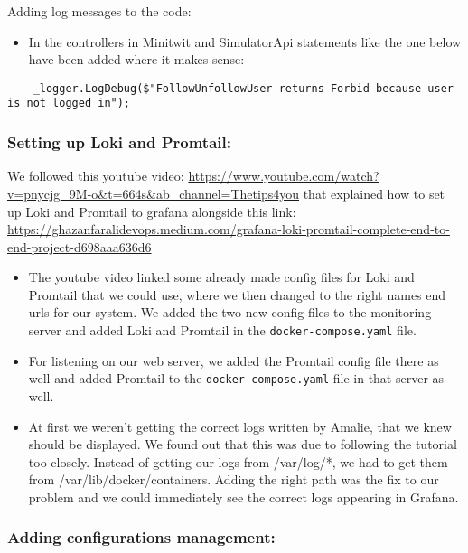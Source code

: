 Adding log messages to the code:

\begin{itemize}
    \item In the controllers in Minitwit and SimulatorApi statements like the one below have been added where it makes sense:
\end{itemize}


\begin{verbatim}
    _logger.LogDebug($"FollowUnfollowUser returns Forbid because user is not logged in");
\end{verbatim}

\subsubsection{Setting up Loki and Promtail:}
\label{log:setting-up-loki-and-promtail}

We followed this youtube video: \url{https://www.youtube.com/watch?v=pnycjg_9M-o\&t=664s\&ab_channel=Thetips4you} that explained how to set up Loki and Promtail to grafana alongside this link: \url{https://ghazanfaralidevops.medium.com/grafana-loki-promtail-complete-end-to-end-project-d698aaa636d6}

\begin{itemize}
    \item The youtube video linked some already made config files for Loki and Promtail that we could use, where we then changed to the right names end urls for our system. We added the two new config files to the monitoring server and added Loki and Promtail in the \texttt{docker-compose.yaml} file.
    \item For listening on our web server, we added the Promtail config file there as well and added Promtail to the \texttt{docker-compose.yaml} file in that server as well.
    \item At first we weren't getting the correct logs written by Amalie, that we knew should be displayed. We found out that this was due to following the tutorial too closely. Instead of getting our logs from /var/log/*, we had to get them from /var/lib/docker/containers. Adding the right path was the fix to our problem and we could immediately see the correct logs appearing in Grafana.
\end{itemize}

\subsubsection{Adding configurations management:}
\label{log:adding-configurations-management}

